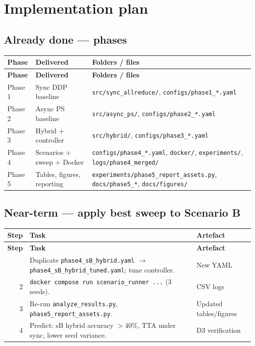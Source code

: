 \documentclass[11pt,a4paper]{article}
\begin{document}
\section{Implementation plan}

\subsection{Already done --- phases}

{\footnotesize
\begin{longtable}{@{}l L L@{}}
  \toprule
  \textbf{Phase} & \textbf{Delivered} & \textbf{Folders / files} \\
  \midrule
  \endfirsthead
  \toprule
  \textbf{Phase} & \textbf{Delivered} & \textbf{Folders / files} \\
  \midrule
  \endhead
  \bottomrule
  \endfoot
  Phase 1 & Sync DDP baseline & \texttt{src/sync\_allreduce/}, \texttt{configs/phase1\_*.yaml} \\
  Phase 2 & Async PS baseline & \texttt{src/async\_ps/}, \texttt{configs/phase2\_*.yaml} \\
  Phase 3 & Hybrid + controller & \texttt{src/hybrid/}, \texttt{configs/phase3\_*.yaml} \\
  Phase 4 & Scenarios + sweep + Docker & \texttt{configs/phase4\_*.yaml}, \texttt{docker/}, \texttt{experiments/}, \texttt{logs/phase4\_merged/} \\
  Phase 5 & Tables, figures, reporting & \texttt{experiments/phase5\_report\_assets.py}, \texttt{docs/phase5\_*}, \texttt{docs/figures/} \\
\end{longtable}
}

\subsection{Near-term --- apply best sweep to Scenario B}

{\footnotesize
\begin{longtable}{@{}r L L@{}}
  \toprule
  \textbf{Step} & \textbf{Task} & \textbf{Artefact} \\
  \midrule
  \endfirsthead
  \toprule
  \textbf{Step} & \textbf{Task} & \textbf{Artefact} \\
  \midrule
  \endhead
  \bottomrule
   & Duplicate \texttt{phase4\_sB\_hybrid.yaml} $\to$ \texttt{phase4\_sB\_hybrid\_tuned.yaml}; tune controller. & New YAML \\
  2 & \texttt{docker compose run scenario\_runner ...} (3 seeds). & CSV logs \\
  3 & Re-run \texttt{analyze\_results.py}, \texttt{phase5\_report\_assets.py}. & Updated tables/figures \\
  4 & Predict: sB hybrid accuracy $>40$\%, TTA under sync, lower seed variance. & D3 verification \\
\end{longtable}
}
\end{document}

